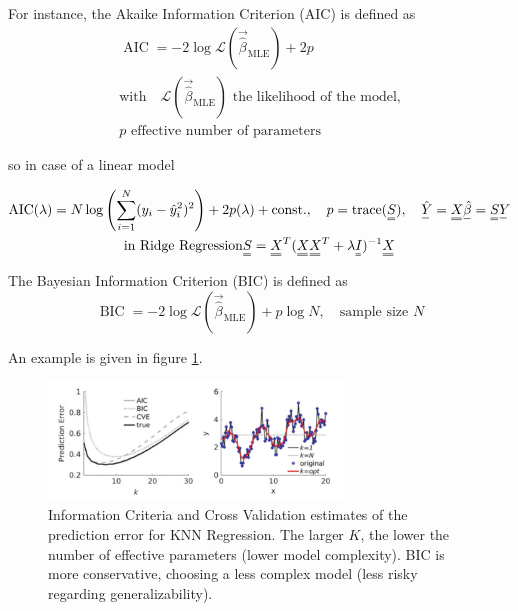 For instance, the \textcolor{blue1}{Akaike Information Criterion (AIC)} is defined as
\begin{equation}
    \begin{gathered}
        \operatorname{AIC} = -2 \log \mathcal{L}(\vec{\hat{\beta}}_\text{MLE}) + 2p \\
        \text{with} \quad \mathcal{L}(\vec{\hat{\beta}}_\text{MLE}) \text{ the likelihood of the model,} \\
        p \text{ effective number of parameters}
    \end{gathered}
\end{equation}

so in case of a linear model

\begin{equation}
    \begin{gathered}
        \operatorname{AIC}(\lambda) = N \log \left( \sum_{i=1}^N (y_i - \hat{y}_i^2)^2 \right) + 2p(\lambda) + \text{const.}, \quad p = \text{trace}(\mat{S}), \quad \vec{\hat{Y}} = \mat{X} \vec{\hat{\beta}} = \mat{S} \vec{Y} \\
        \text{in Ridge Regression} \mat{S} = \mat{X}^T (\mat{X} \mat{X}^T + \lambda \mat{I})^{-1} \mat{X}
    \end{gathered}
\end{equation}

The \textcolor{blue1}{Bayesian Information Criterion (BIC)} is defined as
\begin{equation}
    \operatorname{BIC} = -2 \log \mathcal{L}(\vec{\hat{\beta}}_\text{MLE}) + p \log N, \quad \text{sample size } N
\end{equation}

An example is given in figure \ref{fig:inf_knn_reg}.

\begin{figure}[!htb]
    \centering
    \includegraphics[width=0.7\textwidth]{figures/knn_reg.png}
    \caption{Information Criteria and Cross Validation estimates of the prediction error for KNN Regression.
    The larger $K$, the lower the number of effective parameters (lower model complexity). BIC is more conservative,
    choosing a less complex model (less risky regarding generalizability).}
    \label{fig:inf_knn_reg}
\end{figure}

